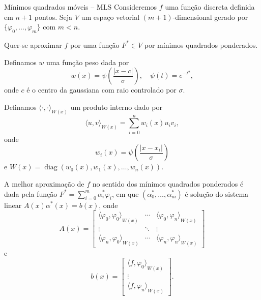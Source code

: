\documentclass[../main/main.tex]{subfiles}
\begin{document}
\begin{frame}{Mínimos quadrados móveis -- MLS}
	Consideremos $f$ uma função discreta definida em $n+1$ pontos. Seja $V$ um espaço vetorial $(m+1)$-dimensional gerado por $\{\varphi_0,\dotsc,\varphi_m\}$ com $m < n$.\pause

	Quer-se aproximar $f$ por uma função $F^*\in V$ por mínimos quadrados ponderados.\pause

	Definamos $w$ uma função peso dada por\[
		w(x) = \psi\left(\frac{|x - c|}{\sigma}\right),\quad \psi(t) = e^{-t^2},
	\] onde $c$ é o centro da gaussiana com raio controlado por $\sigma$.
\end{frame}

\begin{frame}
	Definamos ${\langle\cdot,\cdot\rangle}_{W(x)}$ um produto interno dado por\[
		{\langle u,v\rangle}_{W(x)} = \sum_{i=0}^n w_i(x)u_i v_i,
	\] onde\[
		w_i(x) = \psi\left(\frac{|x - x_i|}{\sigma}\right)
	\] e $W(x) = \operatorname{diag}(w_0(x),w_1(x),\dotsc,w_n(x))$.
\end{frame}

\begin{frame}
	A melhor aproximação de $f$ no sentido dos mínimos quadrados ponderados é dada pela função $F^* = \sum_{i=0}^m \alpha_i^*\varphi_i$, em que $(\alpha_0^*,\dotsc,\alpha_m^*)$ é solução do sistema linear $A(x)\alpha^*(x) = b(x)$, onde\[
		A(x) = \begin{bmatrix}
			{\langle\varphi_0,\varphi_0\rangle}_{W(x)} & \cdots & {\langle\varphi_0,\varphi_n\rangle}_{W(x)} \\
			\vdots                                     & \ddots & \vdots                                     \\
			{\langle\varphi_n,\varphi_0\rangle}_{W(x)} & \cdots & {\langle\varphi_n,\varphi_n\rangle}_{W(x)}
		\end{bmatrix}
	\]
	e\[
		b(x) = \begin{bmatrix}
			{\langle f,\varphi_0\rangle}_{W(x)} \\
			\vdots                              \\
			{\langle f,\varphi_n\rangle}_{W(x)}
		\end{bmatrix}.
	\]
\end{frame}
\end{document}
